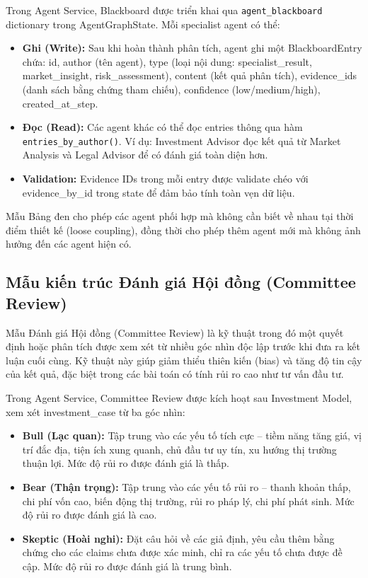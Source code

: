 Trong Agent Service, Blackboard được triển khai qua \texttt{agent\_blackboard} dictionary trong AgentGraphState. Mỗi specialist agent có thể:

\begin{itemize}
    \item \textbf{Ghi (Write):} Sau khi hoàn thành phân tích, agent ghi một BlackboardEntry chứa: id, author (tên agent), type (loại nội dung: specialist\_result, market\_insight, risk\_assessment), content (kết quả phân tích), evidence\_ids (danh sách bằng chứng tham chiếu), confidence (low/medium/high), created\_at\_step.
    \item \textbf{Đọc (Read):} Các agent khác có thể đọc entries thông qua hàm \texttt{entries\_by\_author()}. Ví dụ: Investment Advisor đọc kết quả từ Market Analysis và Legal Advisor để có đánh giá toàn diện hơn.
    \item \textbf{Validation:} Evidence IDs trong mỗi entry được validate chéo với evidence\_by\_id trong state để đảm bảo tính toàn vẹn dữ liệu.
\end{itemize}

Mẫu Bảng đen cho phép các agent phối hợp mà không cần biết về nhau tại thời điểm thiết kế (loose coupling), đồng thời cho phép thêm agent mới mà không ảnh hưởng đến các agent hiện có.

\subsection{Mẫu kiến trúc Đánh giá Hội đồng (Committee Review)}

Mẫu Đánh giá Hội đồng (Committee Review) là kỹ thuật trong đó một quyết định hoặc phân tích được xem xét từ nhiều góc nhìn độc lập trước khi đưa ra kết luận cuối cùng. Kỹ thuật này giúp giảm thiểu thiên kiến (bias) và tăng độ tin cậy của kết quả, đặc biệt trong các bài toán có tính rủi ro cao như tư vấn đầu tư.

Trong Agent Service, Committee Review được kích hoạt sau Investment Model, xem xét investment\_case từ ba góc nhìn:

\begin{itemize}
    \item \textbf{Bull (Lạc quan):} Tập trung vào các yếu tố tích cực -- tiềm năng tăng giá, vị trí đắc địa, tiện ích xung quanh, chủ đầu tư uy tín, xu hướng thị trường thuận lợi. Mức độ rủi ro được đánh giá là thấp.

    \item \textbf{Bear (Thận trọng):} Tập trung vào các yếu tố rủi ro -- thanh khoản thấp, chi phí vốn cao, biến động thị trường, rủi ro pháp lý, chi phí phát sinh. Mức độ rủi ro được đánh giá là cao.

    \item \textbf{Skeptic (Hoài nghi):} Đặt câu hỏi về các giả định, yêu cầu thêm bằng chứng cho các claims chưa được xác minh, chỉ ra các yếu tố chưa được đề cập. Mức độ rủi ro được đánh giá là trung bình.
\end{itemize}

